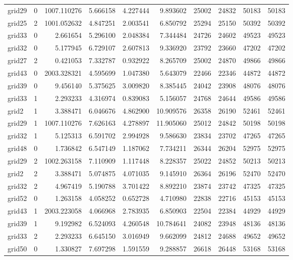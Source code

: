 \begin{longtable}{|l|r|r|r|r|r|r|r|r|r|}
grid29 & 0 & 1007.110276 & 5.666158 & 4.227444 & 9.893602 & 25002 & 24832 & 50183 & 50183 \\
grid25 & 2 & 1001.052632 & 4.847251 & 2.003541 & 6.850792 & 25294 & 25150 & 50392 & 50392 \\
grid33 & 0 & 2.661654 & 5.296100 & 2.048384 & 7.344484 & 24726 & 24602 & 49523 & 49523 \\
grid32 & 0 & 5.177945 & 6.729107 & 2.607813 & 9.336920 & 23792 & 23660 & 47202 & 47202 \\
grid27 & 2 & 0.421053 & 7.332787 & 0.932922 & 8.265709 & 25002 & 24870 & 49866 & 49866 \\
grid43 & 0 & 2003.328321 & 4.595699 & 1.047380 & 5.643079 & 22466 & 22346 & 44872 & 44872 \\
grid39 & 0 & 9.456140 & 5.375625 & 3.009820 & 8.385445 & 24042 & 23908 & 48076 & 48076 \\
grid33 & 1 & 2.293233 & 4.316974 & 0.839083 & 5.156057 & 24768 & 24644 & 49586 & 49586 \\
grid2 & 1 & 3.388471 & 6.046676 & 4.862900 & 10.909576 & 26358 & 26190 & 52461 & 52461 \\
grid29 & 1 & 1007.110276 & 7.626163 & 4.278897 & 11.905060 & 25012 & 24842 & 50198 & 50198 \\
grid32 & 1 & 5.125313 & 6.591702 & 2.994928 & 9.586630 & 23834 & 23702 & 47265 & 47265 \\
grid48 & 0 & 1.736842 & 6.547149 & 1.187062 & 7.734211 & 26344 & 26204 & 52975 & 52975 \\
grid29 & 2 & 1002.263158 & 7.110909 & 1.117448 & 8.228357 & 25022 & 24852 & 50213 & 50213 \\
grid2 & 2 & 3.388471 & 5.074875 & 4.071035 & 9.145910 & 26364 & 26196 & 52470 & 52470 \\
grid32 & 2 & 4.967419 & 5.190788 & 3.701422 & 8.892210 & 23874 & 23742 & 47325 & 47325 \\
grid52 & 0 & 1.263158 & 4.058252 & 0.652728 & 4.710980 & 22838 & 22716 & 45153 & 45153 \\
grid43 & 1 & 2003.223058 & 4.066968 & 2.783935 & 6.850903 & 22504 & 22384 & 44929 & 44929 \\
grid39 & 1 & 9.192982 & 6.524093 & 4.260548 & 10.784641 & 24082 & 23948 & 48136 & 48136 \\
grid33 & 2 & 2.293233 & 6.645150 & 3.016949 & 9.662099 & 24812 & 24688 & 49652 & 49652 \\
grid50 & 0 & 1.330827 & 7.697298 & 1.591559 & 9.288857 & 26618 & 26448 & 53168 & 53168 \\

\end{longtable}
